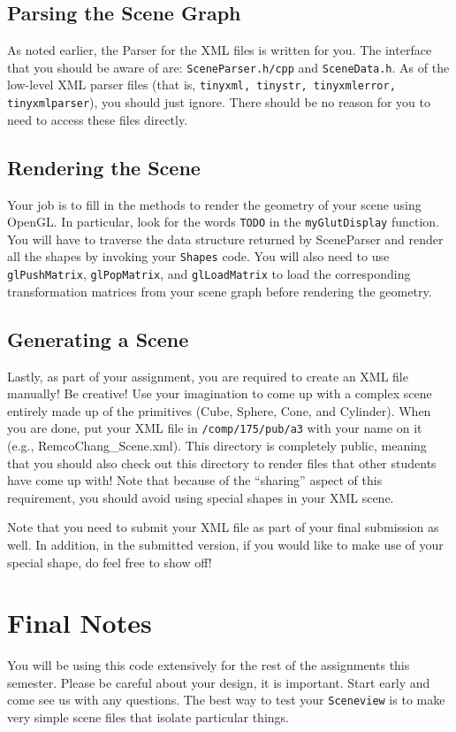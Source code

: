 \documentclass[10pt,twocolumn]{article}
\begin{document}
\subsection{Parsing the Scene Graph}
As noted earlier, the Parser for the XML files is written for you. The interface that you should be aware of are: {\tt SceneParser.h/cpp} and {\tt SceneData.h}. As of the low-level XML parser files (that is, {\tt tinyxml, tinystr, tinyxmlerror, tinyxmlparser}), you should just ignore. There should be no reason for you to need to access these files directly.

\subsection{Rendering the Scene}
Your job is to fill in the methods to render the geometry of your scene using OpenGL. In particular, look for the words {\tt TODO} in the {\tt myGlutDisplay} function. You will have to traverse the data structure returned by SceneParser and render all the shapes by invoking your {\tt Shapes} code. You will also need to use {\tt glPushMatrix}, {\tt glPopMatrix}, and {\tt glLoadMatrix} to load the corresponding transformation matrices from your scene graph before rendering the geometry.

\subsection{Generating a Scene}
Lastly, as part of your assignment, you are required to create an XML file manually! Be creative! Use your imagination to come up with a complex scene entirely made up of the primitives (Cube, Sphere, Cone, and Cylinder). When you are done, put your XML file in {\tt /comp/175/pub/a3} with your name on it (e.g., RemcoChang\_Scene.xml). This directory is completely public, meaning that you should also check out this directory to render files that other students have come up with!  Note that because of the ``sharing'' aspect of this requirement, you should avoid using special shapes in your XML scene.

Note that you need to submit your XML file as part of your final submission as well. In addition, in the submitted version, if you would like to make use of your special shape, do feel free to show off!

\section{Final Notes}
You will be using this code extensively for the rest of the assignments this semester. Please be careful about your design, it is important. Start early and come see us with any questions. The best way to test your {\tt Sceneview} is to make very simple scene files that isolate particular things. 
\end{document}
